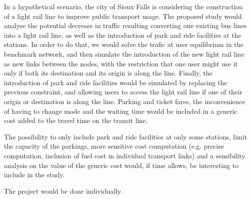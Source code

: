 \documentclass[10pt]{article}
\begin{document}
In a hypothetical scenario, the city of Sioux Falls is considering the construction of a light rail line to improve public transport usage. The proposed study would analyse the potential decrease in traffic resulting converting one existing bus lines into a light rail line, as well as the introduction of park and ride facilities at the stations. In order to do that, we would solve the trafic at user equilibrium in the benchmark network, and then simulate the introduction of the new light rail line as new links between the nodes, with the restriction that one user might use it only if both its destination and its origin is along the line. Finally, the introduction of park and ride facilities would be simulated by replacing the previous constraint, and allowing users to access the light rail line if one of their origin or destination is along the line. Parking and ticket fares, the inconvenience of having to change mode and the waiting time would be included in a generic cost added to the travel time on the transit line.

The possibility to only include park and ride facilities at only some stations, limit the capacity of the parkings, more sensitive cost computation (e.g. precise computation, inclusion of fuel cost in individual transport links) and a sensibility analysis on the value of the generic cost would, if time allows, be interesting to include in the study.


The project would be done individually.
\end{document}
